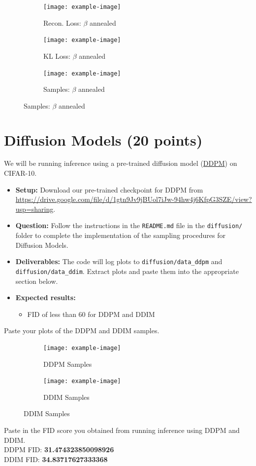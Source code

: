 \documentclass[11pt,addpoints,answers]{exam}
\numberwithin{equation}{section} %
\numberwithin{figure}{section} %
\numberwithin{table}{section} %
\begin{document}
\begin{questions}
\begin{figure}[H]
    \begin{subfigure}[b]{0.32\linewidth}
    \texttt{[image: example-image]}
    \caption{Recon. Loss: $\beta$ annealed}
    \end{subfigure}
    \begin{subfigure}[b]{0.32\linewidth}
    \texttt{[image: example-image]}
    \caption{KL Loss: $\beta$ annealed}
    \end{subfigure}
    \begin{subfigure}[b]{0.32\linewidth}
    \texttt{[image: example-image]}
    \caption{Samples: $\beta$ annealed}
    \end{subfigure}
\end{figure}
\end{questions}
\newpage

\section{Diffusion Models (20 points)}
We will be running inference using a pre-trained diffusion model (\href{https://arxiv.org/abs/2006.11239}{DDPM}) on CIFAR-10. 
\begin{itemize}
\item \textbf{Setup:} Download our pre-trained checkpoint for DDPM from \href{https://drive.google.com/file/d/1gtn9Jv9jBUol7iJw-94hw4j6KfpG3SZE/view?usp=sharing}{https://drive.google.com/file/d/1gtn9Jv9jBUol7iJw-94hw4j6KfpG3SZE/view?usp=sharing}.
\item \textbf{Question:} Follow the instructions in the \texttt{README.md} file in the \texttt{diffusion/} folder to complete the implementation of the sampling procedures for Diffusion Models.
\item \textbf{Deliverables:} The code will log plots to \texttt{diffusion/data\_ddpm} and \texttt{diffusion/data\_ddim}. Extract plots and paste them into the appropriate section below. 
\item \textbf{Expected results:} 
    \begin{itemize}
        \item FID of less than 60 for DDPM and DDIM
    \end{itemize}
\end{itemize}
\begin{questions}
\question Paste your plots of the DDPM and DDIM samples.
\begin{figure}[H]
    \centering
    \begin{subfigure}[b]{0.32\linewidth}
        \texttt{[image: example-image]}
        \caption{DDPM Samples}
    \end{subfigure}
    \begin{subfigure}[b]{0.32\linewidth}
        \texttt{[image: example-image]}
        \caption{DDIM Samples}
    \end{subfigure}
\end{figure}
\question Paste in the FID score you obtained from running inference using DDPM and DDIM.
\\
DDPM FID: \textbf{31.474323850098926} \\
DDIM FID: \textbf{34.83717627333368} 

\end{questions}
\clearpage
\end{document}

